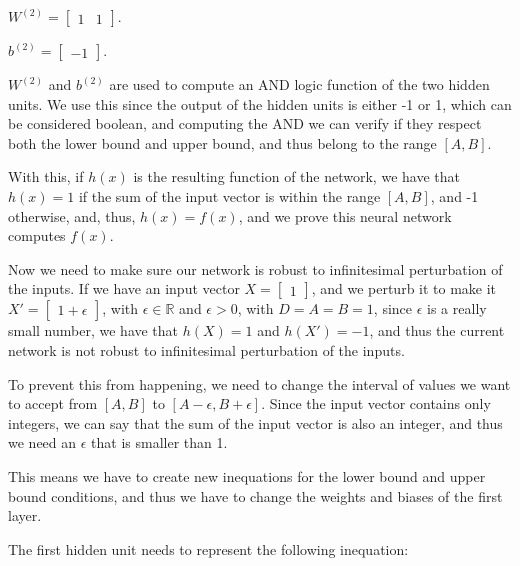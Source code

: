 \documentclass{article}
\begin{document}
\bigskip

\( W^{(2)} = \begin{bmatrix}
    1 & 1
\end{bmatrix}
\).

\medskip

\(b^{(2)} = \begin{bmatrix}
    -1
\end{bmatrix}
\).

\bigskip

\(W^{(2)}\) and \(b^{(2)}\) are used to compute an AND logic function of the two hidden units. We use this since the output of
the hidden units is either -1 or 1, which can be considered boolean, and computing the AND we can verify if they respect both the 
lower bound and upper bound, and thus belong to the range \([A, B]\). 

With this, if \(h(x)\) is the resulting function of the network, we have that \(h(x) = 1\) if the sum of the input vector is within the range \([A, B]\),
and -1 otherwise, and, thus, \(h(x) = f(x)\), and we prove this neural network computes \(f(x)\).

\bigskip

Now we need to make sure our network is robust to infinitesimal perturbation of the inputs.
If we have an input vector $X = \begin{bmatrix}
    1
\end{bmatrix}
$, and we perturb it to make it $X' = \begin{bmatrix}
    1 + \epsilon
\end{bmatrix}
$, with $\epsilon \in \mathbb{R}$ and $\epsilon > 0$, with $D = A = B = 1$, since $\epsilon$ is a really small number, 
we have that $h(X) = 1$ and $h(X') = -1$, and thus the current network is not robust to infinitesimal perturbation of the inputs.

\bigskip

To prevent this from happening, we need to change the interval of values we want to accept from $[A, B]$ to $[A - \epsilon, B + \epsilon]$.
Since the input vector contains only integers, we can say that
the sum of the input vector is also an integer, and thus we need an $\epsilon$ that is smaller than 1. 

This means we have to create new inequations for the lower bound and upper bound conditions, 
and thus we have to change the weights and biases of the first layer.

The first hidden unit needs to represent the following inequation:
\end{document}
